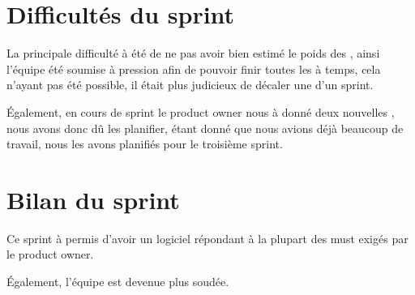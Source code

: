 \section{Difficultés du sprint}
La principale difficulté à été de ne pas avoir bien estimé le poids des \USs{}, ainsi l'équipe été
soumise à pression afin de pouvoir finir toutes les \USs{} à temps, cela n'ayant pas été possible, il 
était plus judicieux de décaler une \USs{} d'un sprint. 

Également, en cours de sprint le product owner nous à donné deux nouvelles \USs{}, nous avons donc dû les 
planifier, étant donné que nous avions déjà beaucoup de travail, nous les avons planifiés pour le 
troisième sprint.
\section{Bilan du sprint}
Ce sprint à permis d'avoir un logiciel répondant à la plupart des must exigés par le product owner.

Également, l'équipe est devenue plus soudée.


